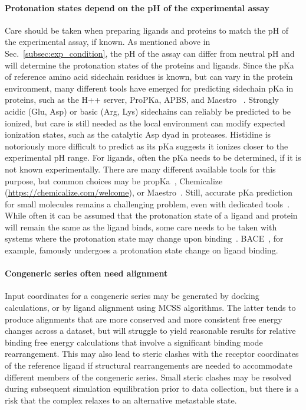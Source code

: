 \documentclass[9pt,bestpractices,pubversion]{livecoms}
\begin{document}
\paragraph{Protonation states depend on the pH of the experimental assay}
Care should be taken when preparing ligands and proteins to match the pH of the experimental assay, if known. As mentioned above in Sec.~\ref{subsec:exp_condition}, the pH of the assay can differ from neutral pH and will determine the protonation states of the proteins and ligands. Since the pKa of reference amino acid sidechain residues is known, but can vary in the protein environment, many different tools have emerged for predicting sidechain pKa in proteins, such as the H++ server, ProPKa, APBS, and Maestro ~\cite{anandakrishnan2012automating, sondergaard2011improved, jurrus2018improvements, 2020schrodinger}. Strongly acidic (Glu, Asp) or basic (Arg, Lys) sidechains can reliably be predicted to be ionized, but care is still needed as the local environment can modify expected ionization states, such as  the catalytic Asp dyad in proteases. Histidine is notoriously more difficult to predict as its pKa suggests it ionizes closer to the experimental pH range. For ligands, often the pKa needs to be determined, if it is not known experimentally. There are many different available tools for this purpose, but common choices may be propKa~\cite{olsson2011propka3,sondergaard2011improved}, Chemicalize (\url{https://chemicalize.com/welcome}), or Maestro~\cite{2020schrodinger}. Still, accurate pKa prediction for small molecules remains a challenging problem, even with dedicated tools~\cite{isik2018pka}. While often it can be assumed that the protonation state of a ligand and protein will remain the same as the ligand binds, some care needs to be taken with systems where the protonation state may change upon binding~\cite{onufriev2013protonation}. BACE~\cite{kim2015conformational}, for example, famously undergoes a protonation state change on ligand binding.


\paragraph{Congeneric series often need alignment}
Input coordinates for a congeneric series may be generated by docking calculations, or by ligand alignment using MCSS algorithms. The latter tends to produce alignments that are more conserved and more consistent free energy changes across a dataset, but will struggle to yield reasonable results for relative binding free energy calculations that involve a significant binding mode rearrangement. This may also lead to steric clashes with the receptor coordinates of the reference ligand if structural rearrangements are needed to accommodate different members of the congeneric series. Small steric clashes may be resolved during subsequent simulation equilibration prior to data collection, but there is a risk that the complex relaxes to an alternative metastable state. 
\end{document}
